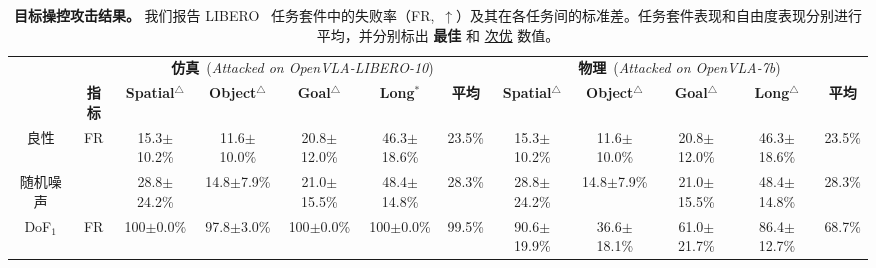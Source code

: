 \begin{table}[htbp]
    \centering
    \small
    \caption{\textbf{目标操控攻击结果。} 我们报告 LIBERO~\cite{LIBREO} 任务套件中的失败率（FR,~$\uparrow$）及其在各任务间的标准差。任务套件表现和自由度表现分别进行平均，并分别标出 \textbf{最佳} 和 \underline{次优} 数值。}
    \begin{adjustbox}{max width=\textwidth,center}
    \begin{tabular}{c|c|cccccccccc}
    \toprule
    \rowcolor{mygray}
                             &                     & \multicolumn{5}{c|}{\textbf{仿真}~(\textit{Attacked on OpenVLA-LIBERO-10})}                                                                                                           & \multicolumn{5}{c}{\textbf{物理}~(\textit{Attacked on OpenVLA-7b})}                                                                                                             \\
\rowcolor{mygray}
\multirow{-2}{*}{\textbf{目标 DoF}}          & \multirow{-2}{*}{\textbf{指标}} & \textbf{Spatial$^\triangle$} & \textbf{Object$^\triangle$} & \textbf{Goal$^\triangle$} & \textbf{Long$^*$} & \multicolumn{1}{c|}{\textbf{平均}} & \textbf{Spatial$^\triangle$} & \textbf{Object$^\triangle$} & \textbf{Goal$^\triangle$} & \textbf{Long$^\triangle$} & \textbf{平均} \\
\midrule
\midrule
\multicolumn{1}{c|}{良性}               & \multirow{2}{*}{FR}                 & 15.3$\pm$10.2\%                           & 11.6$\pm$10.0\%                           & 20.8$\pm$12.0\%                         & 46.3$\pm$18.6\%                         & \multicolumn{1}{c|}{\cellcolor{mygray}23.5\%}    & 15.3$\pm$10.2\%                            & 11.6$\pm$10.0\%                           & 20.8$\pm$12.0\%                         & 46.3$\pm$18.6\%                         & \cellcolor{mygray} 23.5\%                        \\
\multicolumn{1}{c|}{随机噪声}         &                                     & 28.8$\pm$24.2\%                           & 14.8$\pm$7.9\%                            & 21.0$\pm$15.5\%                         & 48.4$\pm$14.8\%                         & \multicolumn{1}{c|}{\cellcolor{mygray}28.3\%}    & 28.8$\pm$24.2\%                            & 14.8$\pm$7.9\%                            & 21.0$\pm$15.5\%                         & 48.4$\pm$14.8\%                         & \cellcolor{mygray} 28.3\%                        \\
\midrule
\multicolumn{1}{c|}{DoF$_1$}              & \multirow{9}{*}{FR}                 & 100$\pm$0.0\%                           & 97.8$\pm$3.0\%                           & 100$\pm$0.0\%                         & 100$\pm$0.0\%                         & \multicolumn{1}{c|}{\cellcolor{mygray}99.5\%}                & 90.6$\pm$19.9\%                            & 36.6$\pm$18.1\%                            & 61.0$\pm$21.7\%                         & 86.4$\pm$12.7\%                         & \cellcolor{mygray} 68.7\%                        \\

\end{tabular}
\end{adjustbox}
\end{table}
